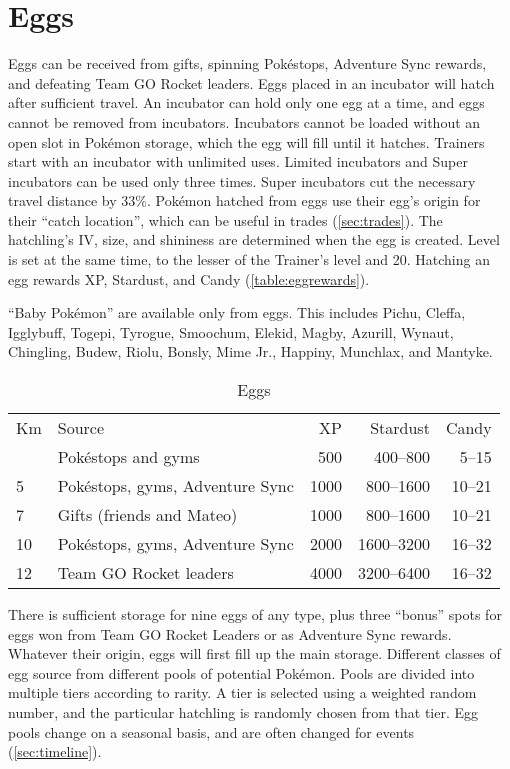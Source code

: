 \section{Eggs\label{sec:eggs}}
Eggs can be received from gifts, spinning Pokéstops, Adventure Sync rewards,
  and defeating Team GO Rocket leaders.
Eggs placed in an incubator will hatch after sufficient travel.
An incubator can hold only one egg at a time, and eggs cannot be removed from incubators.
Incubators cannot be loaded without an open slot in Pokémon storage, which the egg will fill
 until it hatches.
Trainers start with an incubator with unlimited uses.
Limited incubators and Super incubators can be used only three times.
Super incubators cut the necessary travel distance by 33\%.
Pokémon hatched from eggs use their egg's origin for their ``catch location'',
 which can be useful in trades (\autoref{sec:trades}).
The hatchling's IV, size, and shininess are determined when the egg is created.
Level is set at the same time, to the lesser of the Trainer's level and 20.
Hatching an egg rewards XP, Stardust, and Candy (\autoref{table:eggrewards}).
\begin{tipbox}[title=Baby Pokémon]
``Baby Pokémon'' are available only from eggs.
This includes Pichu, Cleffa, Igglybuff, Togepi, Tyrogue, Smoochum, Elekid, Magby,
 Azurill, Wynaut, Chingling, Budew, Riolu, Bonsly, Mime Jr., Happiny, Munchlax, and Mantyke.
\end{tipbox}
\begin{table}
\centering
\begin{tabular}{llrrr}
Km & Source & XP & Stardust & Candy\\
\Midrule
  2 & Pokéstops and gyms & 500 & 400--800 & 5--15\\
  5 & Pokéstops, gyms, Adventure Sync & 1000 & 800--1600 & 10--21\\
  7 & Gifts (friends and Mateo) & 1000 & 800--1600 & 10--21\\
  10 & Pokéstops, gyms, Adventure Sync & 2000 & 1600--3200 & 16--32\\
  12 & Team GO Rocket leaders & 4000 & 3200--6400 & 16--32\\
\end{tabular}
\caption{Eggs\label{table:eggrewards}}
\end{table}
There is sufficient storage for nine eggs of any type, plus three ``bonus''
 spots for eggs won from Team GO Rocket Leaders or as Adventure Sync rewards.
Whatever their origin, eggs will first fill up the main storage.
Different classes of egg source from different pools of potential Pokémon.
Pools are divided into multiple tiers according to rarity.
A tier is selected using a weighted random number, and the particular hatchling
 is randomly chosen from that tier.
Egg pools change on a seasonal basis, and are often changed for events (\autoref{sec:timeline}).

